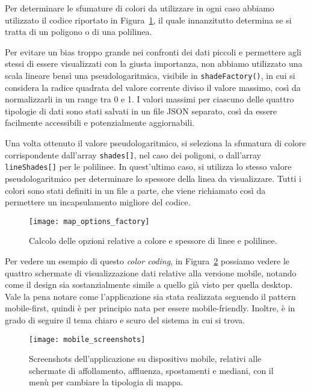 Per determinare le sfumature di colori da utilizzare in ogni caso abbiamo utilizzato il codice riportato in Figura~\ref{fig:map_options_factory}, il quale innanzitutto determina se si tratta di un poligono o di una polilinea.

Per evitare un bias troppo grande nei confronti dei dati piccoli e permettere agli stessi di essere visualizzati con la giusta importanza, non abbiamo utilizzato una scala lineare bensì una pseudologaritmica, visibile in \Verb_shadeFactory()_, in cui si considera la radice quadrata del valore corrente diviso il valore massimo, così da normalizzarli in un range tra 0 e 1. I valori massimi per ciascuno delle quattro tipologie di dati sono stati salvati in un file JSON separato, così da essere facilmente accessibili e potenzialmente aggiornabili.

Una volta ottenuto il valore pseudologaritmico, si seleziona la sfumatura di colore corrispondente dall'array \Verb_shades[]_, nel caso dei poligoni, o dall'array \Verb_lineShades[]_ per le polilinee. In quest'ultimo caso, si utilizza lo stesso valore pseudologaritmico per determinare lo spessore della linea da visualizzare. Tutti i colori sono stati definiti in un file a parte, che viene richiamato così da permettere un incapsulamento migliore del codice.

\begin{figure}[H]
    \centering
    \texttt{[image: map\_options\_factory]}
    \caption[Calcolo delle opzioni su colore e spessore]{Calcolo delle opzioni relative a colore e spessore di linee e polilinee.}
    \label{fig:map_options_factory}
\end{figure}

Per vedere un esempio di questo \textit{color coding}, in Figura~\ref{fig:mobile} possiamo vedere le quattro schermate di visualizzazione dati relative alla versione mobile, notando come il design sia sostanzialmente simile a quello già visto per quella desktop.
Vale la pena notare come l'applicazione sia stata realizzata seguendo il pattern mobile-first, quindi è per principio nata per essere mobile-friendly. Inoltre, è in grado di seguire il tema chiaro e scuro del sistema in cui si trova.

\begin{figure}[H]
    \centering
    \texttt{[image: mobile\_screenshots]}
    \caption[Screenshots su mobile]{Screenshots dell'applicazione su dispositivo mobile, relativi alle schermate di affollamento, affluenza, spostamenti e mediani, con il menù per cambiare la tipologia di mappa.}
    \label{fig:mobile}
\end{figure}


